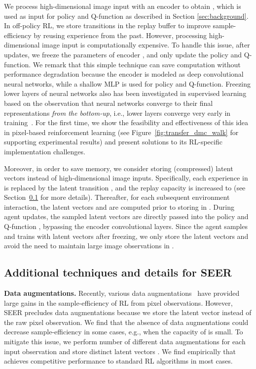 \documentclass{article}
\begin{document}
We process high-dimensional image input with an encoder  to obtain , which is used as input for policy  and Q-function  as described in Section \ref{sec:background}. In off-policy RL, 
we store transitions  in the replay buffer  to improve sample-efficiency by reusing experience from the past.
However, processing high-dimensional image input  is computationally expensive. 
To handle this issue, after  updates,
we freeze the parameters of encoder , and only update the policy and Q-function.
We remark that this simple technique can save computation without performance degradation because the encoder is modeled as deep convolutional neural networks, while a shallow MLP is used for policy and Q-function. Freezing lower layers of neural networks also has been investigated in supervised learning based on the observation that neural networks converge to their final representations {\em from the bottom-up}, i.e., lower layers converge very early in training~\citep{46337}. For the first time, we show the feasibility and effectiveness of this idea in pixel-based reinforcement learning (see Figure~\ref{fig:transfer_dmc_walk} for supporting experimental results) and present solutions to its RL-specific implementation challenges. 






Moreover, in order to save memory, 
we consider storing (compressed) latent vectors instead of high-dimensional image inputs.
Specifically, 
each experience in  is replaced by the latent transition , and the replay capacity is increased to  (see Section~\ref{sec:detail} for more details). 
Thereafter, for each subsequent environment interaction, 
the latent vectors  and  are computed prior to storing  in . During agent updates, the sampled latent vectors are directly passed into the policy  and Q-function , bypassing the encoder convolutional layers. Since the agent samples and trains with latent vectors after freezing, we only store the latent vectors and avoid the need to maintain large image observations in .




\subsection{Additional techniques and details for SEER} \label{sec:detail}

\textbf{Data augmentations.} Recently, various data augmentations~\citep{srinivas2020curl, laskin2020reinforcement,kostrikov2020image} have provided large gains in the sample-efficiency of RL from pixel observations.
However, SEER precludes data augmentations because we store the latent vector instead of the raw pixel observation.
We find that the absence of data augmentations could decrease sample-efficiency in some cases, e.g., when the capacity of  is small.
To mitigate this issue,
we perform  number of different data augmentations for each input observation  and store  distinct latent vectors .
We find empirically that  achieves competitive performance to standard RL algorithms in most cases.
\end{document}
